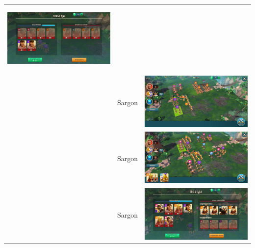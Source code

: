 \begin{longtable}{|c|c|c|}
    \hypertarget{fight32}{\includegraphics[width=0.75\linewidth]{./parts/media/TreasureHunt/32/sargon/photo_2022-04-07_10-05-45.jpg}} \\
    & Sargon &
    \includegraphics[width=0.75\linewidth]{./parts/media/TreasureHunt/32/sargon/photo_2022-04-07_10-05-42.jpg} \\
    & Sargon &
    \includegraphics[width=0.75\linewidth]{./parts/media/TreasureHunt/32/sargon/photo_2022-04-07_10-05-31.jpg} \\
    & Sargon &
    \includegraphics[width=0.75\linewidth]{./parts/media/TreasureHunt/32/sargon/photo_2022-04-07_10-05-39.jpg} \\

\end{longtable}
